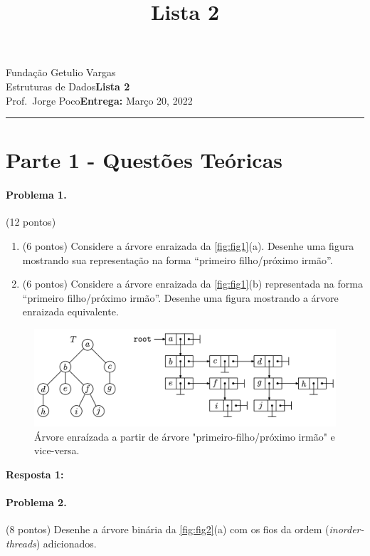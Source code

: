 \documentclass{article}
\title{Lista 2}
\date{}
\newcommand{\assignment}{Lista 2}
\newcommand{\duedate}{Março 20, 2022}
\begin{document}
Fundação Getulio Vargas\hfill\\
Estruturas de Dados\hfill\textbf{\assignment}\\
Prof.\ Jorge Poco\hfill\textbf{Entrega:} \duedate\\
\smallskip\hrule\bigskip

{\let\newpage\relax\maketitle}
\maketitle

\section*{Parte 1 - Questões Teóricas}

\paragraph{Problema 1.}(12 pontos)
\begin{enumerate}[label*=1.\arabic*.]
  \item (6 pontos) Considere a árvore enraizada da \autoref{fig:fig1}(a). Desenhe uma figura mostrando sua representação na forma “primeiro filho/próximo irmão”.
  \item (6 pontos) Considere a árvore enraizada da \autoref{fig:fig1}(b) representada na forma “primeiro filho/próximo irmão”. Desenhe uma figura mostrando a árvore enraizada equivalente.
\end{enumerate}

\begin{figure}[!h]
  \centering
    \includegraphics[width=.6\textwidth]{figures/fig1.png}
    \caption{Árvore enraízada a partir de árvore "primeiro-filho/próximo irmão" e vice-versa.}
  \label{fig:fig1}
\end{figure}


\textbf{Resposta 1:}

\paragraph{Problema 2.} (8 pontos) Desenhe a árvore binária da \autoref{fig:fig2}(a) com os fios da ordem (\emph{inorder-threads}) adicionados.
\end{document}
